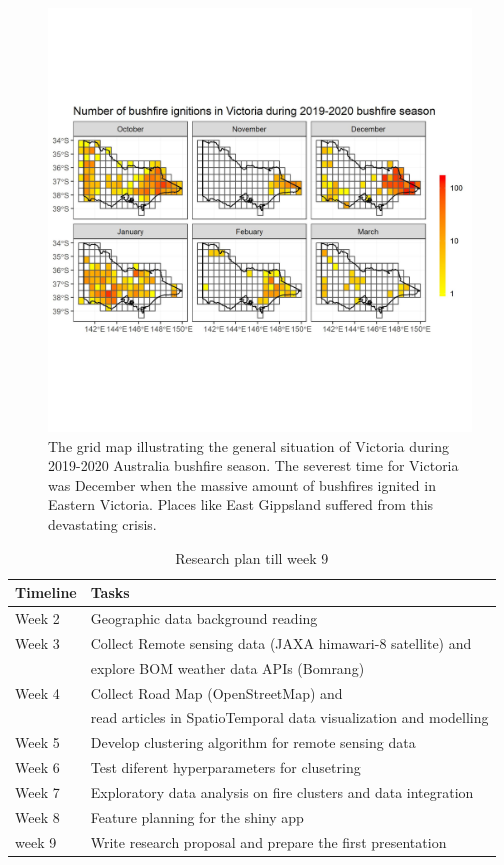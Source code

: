 \documentclass[11pt,a4paper,]{article}
\begin{document}
\begin{figure}
\centering
\includegraphics[width=5.20833in,height=\textheight]{figures/number_of_ignitions.jpg}
\caption{The grid map illustrating the general situation of Victoria during 2019-2020 Australia bushfire season. The severest time for Victoria was December when the massive amount of bushfires ignited in Eastern Victoria. Places like East Gippsland suffered from this devastating crisis. \label{fig:overview}}
\end{figure}

\begin{table}[!h]

\caption{\label{tab:timeline1}Research plan till week 9}
\centering
\begin{tabular}[t]{ll}
\toprule
Timeline & Tasks\\
\midrule
Week 2 & Geographic data background reading\\
Week 3 & Collect Remote sensing data (JAXA himawari-8 satellite) and\\
 & explore BOM weather data APIs (Bomrang)\\
Week 4 & Collect Road Map (OpenStreetMap) and\\
 & read articles in SpatioTemporal data visualization and modelling\\
\addlinespace
Week 5 & Develop clustering algorithm for remote sensing data\\
Week 6 & Test diferent hyperparameters for clusetring\\
Week 7 & Exploratory data analysis on fire clusters and data integration\\
Week 8 & Feature planning for the shiny app\\
week 9 & Write research proposal and prepare the first presentation\\
\bottomrule
\end{tabular}
\end{table}
\end{document}
